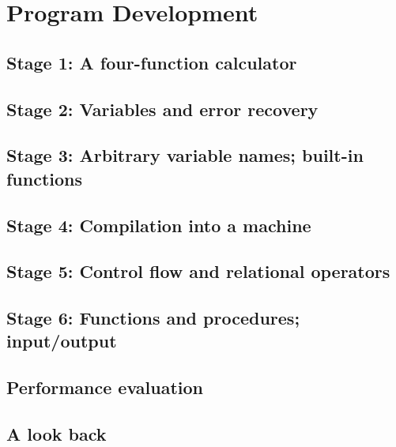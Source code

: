 \chapter{Program Development}
\section{Stage 1: A four-function calculator}
\section{Stage 2: Variables and error recovery}
\section{Stage 3: Arbitrary variable names; built-in functions}
\section{Stage 4: Compilation into a machine}
\section{Stage 5: Control flow and relational operators}
\section{Stage 6: Functions and procedures; input/output}
\section{Performance evaluation}
\section{A look back}
